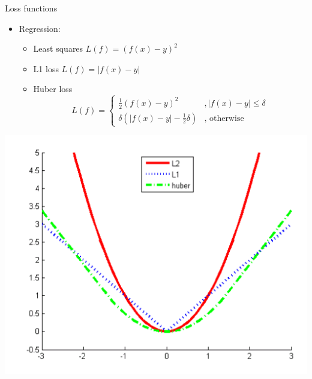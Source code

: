 \documentclass[12pt,notes,mathserif]{beamer}
\providecommand{\tightlist}{%
	\setlength{\itemsep}{0pt}\setlength{\parskip}{0pt}}
\begin{document}
\begin{frame}{Loss functions}

\begin{itemize}
\tightlist
\item
  Regression:

  \begin{itemize}
  \tightlist
  \item
    Least squares \(L(f)=(f(x)-y)^{2}\)
  \item
    L1 loss \(L(f)=|f(x)-y|\)
  \item
    Huber loss
    \[L({f})=\begin{cases} \frac{1}{2} (f(x)-y)^2 & , |f(x)-y| \le \delta \\ \delta (|f(x)-y| -\frac{1}{2} \delta ) & \textrm{, otherwise} \end{cases}\]
  \end{itemize}
\end{itemize}

\begin{center}
    \includegraphics[width=.42\textwidth]{2018-04-15-13-10-18.png}
\end{center}

\end{frame}
\end{document}
